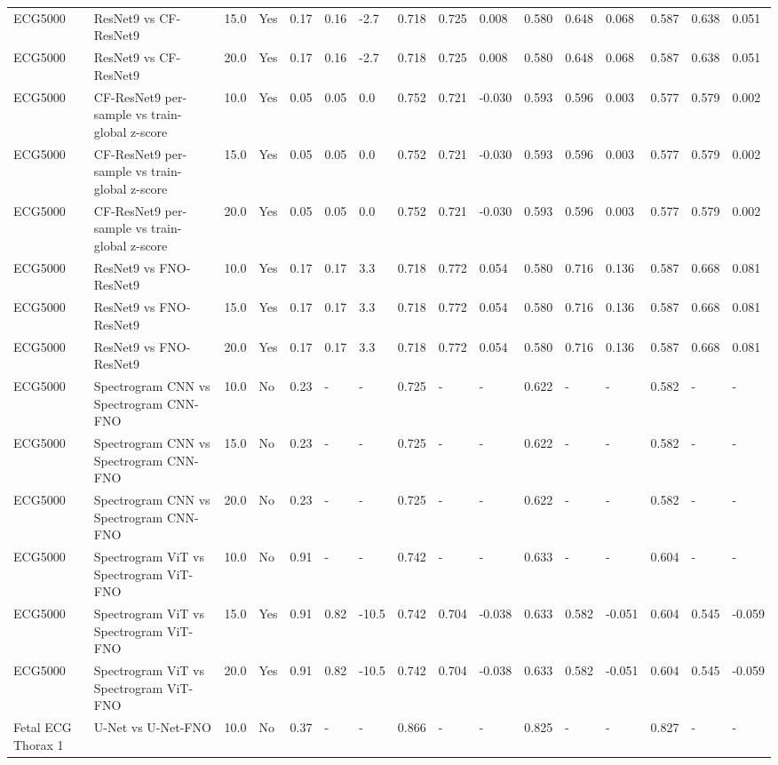 \begin{longtable}{llllllllllllllll}
ECG5000 & ResNet9 vs CF-ResNet9 & 15.0 & Yes & 0.17 & 0.16 & -2.7 & 0.718 & 0.725 & 0.008 & 0.580 & 0.648 & 0.068 & 0.587 & 0.638 & 0.051 \\
ECG5000 & ResNet9 vs CF-ResNet9 & 20.0 & Yes & 0.17 & 0.16 & -2.7 & 0.718 & 0.725 & 0.008 & 0.580 & 0.648 & 0.068 & 0.587 & 0.638 & 0.051 \\
ECG5000 & CF-ResNet9 per-sample vs train-global z-score & 10.0 & Yes & 0.05 & 0.05 & 0.0 & 0.752 & 0.721 & -0.030 & 0.593 & 0.596 & 0.003 & 0.577 & 0.579 & 0.002 \\
ECG5000 & CF-ResNet9 per-sample vs train-global z-score & 15.0 & Yes & 0.05 & 0.05 & 0.0 & 0.752 & 0.721 & -0.030 & 0.593 & 0.596 & 0.003 & 0.577 & 0.579 & 0.002 \\
ECG5000 & CF-ResNet9 per-sample vs train-global z-score & 20.0 & Yes & 0.05 & 0.05 & 0.0 & 0.752 & 0.721 & -0.030 & 0.593 & 0.596 & 0.003 & 0.577 & 0.579 & 0.002 \\
ECG5000 & ResNet9 vs FNO-ResNet9 & 10.0 & Yes & 0.17 & 0.17 & 3.3 & 0.718 & 0.772 & 0.054 & 0.580 & 0.716 & 0.136 & 0.587 & 0.668 & 0.081 \\
ECG5000 & ResNet9 vs FNO-ResNet9 & 15.0 & Yes & 0.17 & 0.17 & 3.3 & 0.718 & 0.772 & 0.054 & 0.580 & 0.716 & 0.136 & 0.587 & 0.668 & 0.081 \\
ECG5000 & ResNet9 vs FNO-ResNet9 & 20.0 & Yes & 0.17 & 0.17 & 3.3 & 0.718 & 0.772 & 0.054 & 0.580 & 0.716 & 0.136 & 0.587 & 0.668 & 0.081 \\
ECG5000 & Spectrogram CNN vs Spectrogram CNN-FNO & 10.0 & No & 0.23 & - & - & 0.725 & - & - & 0.622 & - & - & 0.582 & - & - \\
ECG5000 & Spectrogram CNN vs Spectrogram CNN-FNO & 15.0 & No & 0.23 & - & - & 0.725 & - & - & 0.622 & - & - & 0.582 & - & - \\
ECG5000 & Spectrogram CNN vs Spectrogram CNN-FNO & 20.0 & No & 0.23 & - & - & 0.725 & - & - & 0.622 & - & - & 0.582 & - & - \\
ECG5000 & Spectrogram ViT vs Spectrogram ViT-FNO & 10.0 & No & 0.91 & - & - & 0.742 & - & - & 0.633 & - & - & 0.604 & - & - \\
ECG5000 & Spectrogram ViT vs Spectrogram ViT-FNO & 15.0 & Yes & 0.91 & 0.82 & -10.5 & 0.742 & 0.704 & -0.038 & 0.633 & 0.582 & -0.051 & 0.604 & 0.545 & -0.059 \\
ECG5000 & Spectrogram ViT vs Spectrogram ViT-FNO & 20.0 & Yes & 0.91 & 0.82 & -10.5 & 0.742 & 0.704 & -0.038 & 0.633 & 0.582 & -0.051 & 0.604 & 0.545 & -0.059 \\
Fetal ECG Thorax 1 & U-Net vs U-Net-FNO & 10.0 & No & 0.37 & - & - & 0.866 & - & - & 0.825 & - & - & 0.827 & - & - \\

\end{longtable}
